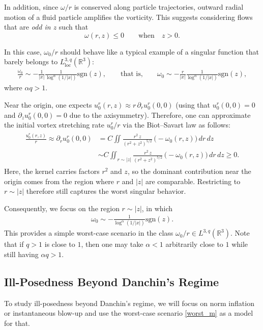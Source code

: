 \documentclass[reqno,11pt]{amsart}
\begin{document}
In addition, since $\omega/r$ is conserved along particle trajectories, outward radial motion of a fluid particle amplifies the vorticity. This suggests
considering flows that are \emph{odd in $z$} such that 
\[
\omega(r,z)\le 0 \qquad \text{when} \quad  z>0.
\]

In this case, $\omega_0/r$ should behave like a typical example of a singular
function that barely belongs to $L^{3,q}_{\mathrm{loc}}(\mathbb{R}^3)$:
\begin{align*}
        \frac{\omega_0}{r}
    \sim 
        -\frac{1}{|x|} 
        \frac{1}{\log ^\alpha (1/|x|)}\mathrm{sgn}(z),
    \qquad \text{that is,}\qquad  
        \omega_0 \sim -\frac{r}{|x|} 
        \frac{1}{\log^\alpha (1/|x|)}\mathrm{sgn}(z),
\end{align*}
where $\alpha q>1$.

Near the origin, one expects $u^r_0(r,z)\approx r\,\partial_r u^r_0(0,0)$ (using
that $u^r_0(0,0)=0$ and $\partial_z u^r_0 (0,0)=0$ due to the axisymmetry). Therefore, one can approximate
the initial vortex stretching rate $u^r_0/r$ via the Biot--Savart law as follows:
\begin{align}
\label{ini_vs}
\begin{aligned}
        \frac{u^r_0(r,z)}{r}
    \approx
        \partial_r u^r_0(0,0)
    &=
        C\iint \frac{r^2\, z}{(r^2+z^2)^{5/2}} \,\big(- \omega_0 (r,z) \big) \, dr\,dz
        \\
    &\sim
        C\iint_{r\sim |z|} \frac{r^2\, z}{(r^2+z^2)^{5/2}} \,\big(- \omega_0 (r,z) \big) \, dr\,dz \ge 0.
\end{aligned}
\end{align}
Here, the kernel carries factors $r^2$ and $z$, so the dominant contribution near
the origin comes from the region where $r$ and $|z|$ are comparable. Restricting
to $r\sim |z|$ therefore still captures the worst singular behavior.

Consequently, we focus on the region $r\sim |z|$, in which
\begin{align}
\label{worst_m}
        \omega_0 \sim -\frac{1}{\log^\alpha (1/|x|)} \mathrm{sgn}(z).
\end{align}
This provides a simple worst-case scenario in the class
$\omega_0/r\in L^{3,q}(\mathbb{R}^3)$.
Note that if $q>1$ is close to $1$, then one may take $\alpha<1$ arbitrarily close
to $1$ while still having $\alpha q>1$.






\subsection{Ill-Posedness Beyond Danchin's Regime}
\label{sharp_Danchin}
To study ill-posedness beyond Danchin's regime, we will focus on norm inflation or instantaneous blow-up and use the worst-case scenario
\eqref{worst_m} as a model for that.
\end{document}
